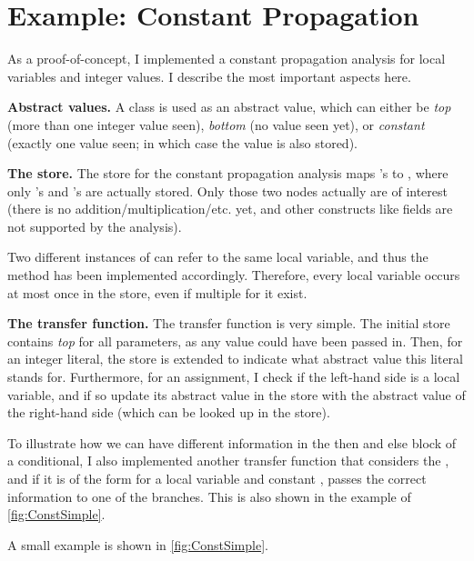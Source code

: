 \section{Example: Constant Propagation}

\begin{workinprogress}
    As a proof-of-concept, I implemented a constant propagation analysis for local variables
    and integer values. I describe the most important aspects here.
    
    \textbf{Abstract values.} A class  is used as an abstract value, which can
    either be \emph{top} (more than one integer value seen), \emph{bottom} (no value seen yet),
    or \emph{constant} (exactly one value seen; in which case the value is also stored).
    
    \textbf{The store.} The store for the constant propagation analysis maps 's to ,
    where only 's and 's are actually stored. Only those
    two nodes actually are of interest (there is no addition/multiplication/etc. yet, and other constructs like
    fields are not supported by the analysis).
    
    Two different instances of  can refer to the same local variable, and thus
    the  method has been implemented accordingly. Therefore, every local variable occurs
    at most once in the store, even if multiple  for it exist.
    
    \textbf{The transfer function.} The transfer function is very simple. The initial store contains
    \emph{top} for all parameters, as any value could have been passed in. Then, for
    an integer literal, the store is extended to indicate what abstract value this literal
    stands for. Furthermore, for an assignment, I check if the left-hand side is
    a local variable, and if so update its abstract value in the
    store with the abstract value of the right-hand side (which can be looked up in the store).
    
    To illustrate how we can have different information in the then and else block of a conditional,
    I also implemented another transfer function that considers the , and if
    it is of the form  for a local variable  and constant , passes
    the correct information to one of the branches. This is also shown in the example of \autoref{fig:ConstSimple}.
    
     A small example is shown in \autoref{fig:ConstSimple}.
\end{workinprogress}

